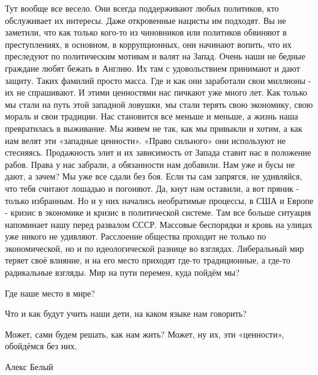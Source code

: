 Тут вообще все весело.  Они всегда поддерживают любых политиков, кто
обслуживает их интересы.  Даже откровенные нацисты им подходят.  Вы не
заметили, что как только кого-то из чиновников или политиков обвиняют в
преступлениях, в основном, в коррупционных,  они начинают вопить, что их
преследуют по политическим мотивам и валят на Запад.  Очень наши не бедные
граждане любят бежать в Англию.  Их там с удовольствием принимают и дают
защиту.  Таких фамилий просто масса.  Где и как они заработали свои миллионы -
их не спрашивают.  И этими ценностями нас пичкают уже много лет.  Как только мы
стали на путь этой западной ловушки, мы стали терять свою экономику, свою
мораль и свои традиции.  Нас становится все меньше и меньше, а жизнь наша
превратилась в выживание.  Мы живем не так, как мы привыкли и хотим, а как нам
велят эти «западные ценности».  «Право сильного» они используют не стесняясь.
Продажность элит и их зависимость от Запада ставит нас в положение рабов.
Права у нас забрали, а обязанности нам добавили.  Нам уже и бусы не дают, а
зачем?  Мы уже все сдали без боя.  Если ты сам запрягся, не удивляйся, что тебя
считают лошадью и погоняют. Да, кнут нам оставили, а вот пряник - только
избранным.  Но и у них начались необратимые процессы, в США и Европе - кризис в
экономике и кризис в политической системе.  Там все больше ситуация напоминает
нашу перед развалом СССР.  Массовые беспорядки и кровь на улицах уже никого не
удивляют.  Расслоение общества проходит не только по экономической, но и по
идеологической разнице во взглядах.  Либеральный мир теряет своё влияние, и на
его место приходят где-то традиционные, а где-то радикальные взгляды.  Мир на
пути перемен, куда пойдём мы?  

Где наше место в мире? 

Что и как будут учить наши дети, на каком языке нам говорить?  

Может, сами будем решать, как нам
жить?  Может, ну их, эти «ценности», обойдёмся без них.  

Алекс Белый
